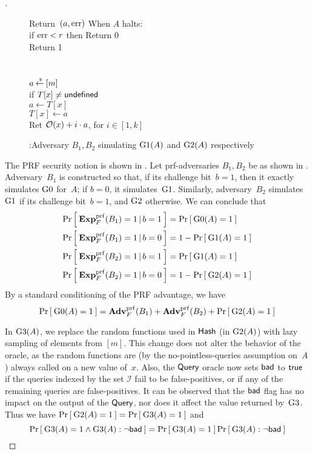 \begin{proof}[]
\begin{figure}
{{Return~$(a,\mathrm{err} )$
When $A$ halts: \\
if $\mathrm{err}  < r$ then Return 0\\
Return 1\\\\
\\
$a {\:\stackrel{{\scriptscriptstyle \hspace{0.2em}\$}} {\leftarrow}\:} [m]$\\
if $T[x] \neq \mathsf{undefined}$\\
\nudge $a \gets T[x]$\\
$T[x] \gets a$\\
Ret  ${\cal O}(x) + i\cdot a$, for $i\in[1,k]$
}
}
\caption{:Adversary $B_1, B_2$ simulating $\text{G1}(A)$ and $\text{G2}(A)$ respectively}\label{fig:BGame1}
\end{figure}

The PRF security notion is shown in . Let
prf-adversaries $B_1, B_2$ be as shown in .
Adversary~$B_1$ is constructed so that, if its challenge bit~$b=1$,
then it exactly simulates $\text{G0}$ for~$A$; if $b=0$, it
simulates~$\text{G1}$.  Similarly, adversary~$B_2$ simulates~$\text{G1}$
if its challenge bit~$b=1$, and $\text{G2}$ otherwise.  We can conclude
that 
\begin{align*}
\Prob{\ExpPRF{F}{B_1} = 1\,|\,b=1} &= \Prob{\game{0}(A)=1} \\%
\Prob{\ExpPRF{F}{B_1} = 1\,|\,b=0} &= 1-\Prob{\game{1}(A)=1} \\%
\Prob{\ExpPRF{F}{B_2} = 1\,|\,b=1} &= \Prob{\game{1}(A)=1} \\%
\Prob{\ExpPRF{F}{B_2} = 1\,|\,b=0} &= 1-\Prob{\game{2}(A)=1} \\%
\end{align*}
%
\noindent
By a standard conditioning of the PRF advantage, we have 
\begin{equation*}
\Prob{\game{0}(A)=1} = \AdvPRF{F}{B_1} +\AdvPRF{F}{B_2} + \Prob{\game{2}(A)=1}%
\end{equation*}


In $\text{G3}(A)$, we replace the random functions used in
$\mathsf{Hash}$ (in $\text{G2}(A)$) with lazy sampling of elements from
$[m]$.  This change does not alter the behavior of the oracle, as the
random functions are (by the no-pointless-queries assumption on~$A$) always called on a new
value of~$x$.
%
Also, the $\mathsf{Query}$ oracle now sets $\mathsf{bad}$ to $\mathsf{true}$ if the
queries indexed by the set $\mathcal{I}$ fail to be false-positives,
or if any of the remaining queries are false-positives. It can be
observed that the $\mathsf{bad}$ flag has no impact on the output of the
$\mathsf{Query}$, nor does it affect  the value returned
by~$\text{G3}$. Thus we have $\Pr\left[\: \text{G2}(A)=1 \:\right] =
\Pr\left[\: \text{G3}(A)=1 \:\right]$ and
\[
\Prob{\game{3}(A)=1 \wedge \game{3}(A): \neg\bad} = \Prob{\game{3}(A)=1} \Prob{\game{3}(A) : \neg\bad}%
\]


\end{proof}
